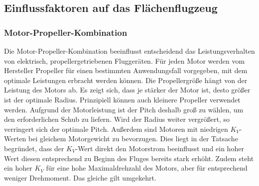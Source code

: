 \subsection{Einflussfaktoren auf das Flächenflugzeug}

\subsubsection{Motor-Propeller-Kombination}
Die Motor-Propeller-Kombination beeinflusst entscheidend das Leistungsverhalten von elektrisch, propellergetriebenen Fluggeräten. Für jeden Motor werden vom Hersteller Propeller für einen bestimmten Anwendungsfall vorgegeben, mit dem optimale Leistungen erbracht werden können. Die Propellergröße hängt von der Leistung des Motors ab. Es zeigt sich, dass je stärker der Motor ist, desto größer ist der optimale Radius. Prinzipiell können auch kleinere Propeller verwendet werden. Aufgrund der Motorleistung ist der Pitch deshalb groß zu wählen, um den erforderlichen Schub zu liefern. Wird der Radius weiter vergrößert, so verringert sich der optimale Pitch. Außerdem sind Motoren mit niedrigen \ensuremath{K_V}-Werten bei gleichem Motorgewicht zu bevorzugen. Dies liegt in der Tatsache begründet, dass der \ensuremath{K_V}-Wert direkt den Motorstrom beeinflusst und ein hoher Wert diesen entsprechend zu Beginn des Fluges bereits stark erhöht. Zudem steht ein hoher \ensuremath{K_V} für eine hohe Maximaldrehzahl des Motors, aber für entsprechend weniger Drehmoment. Das gleiche gilt umgekehrt. 


